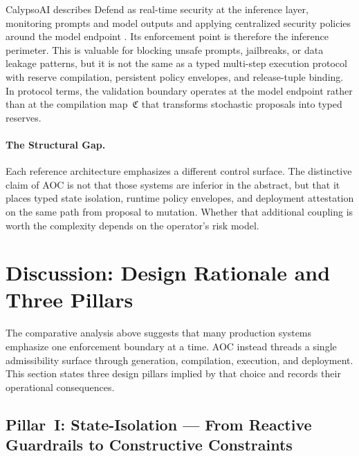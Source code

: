 \documentclass[11pt]{article}
\theoremstyle{remark}
\newcommand{\AOC}{\textup{\textsc{AOC}}}
\begin{document}
\begin{description}[style=nextline, leftmargin=1.5em]
\item[CalypsoAI --- inference-layer perimeter security.]
CalypsoAI describes Defend as real-time security at the inference layer, monitoring prompts and model outputs and applying centralized security policies around the model endpoint \cite{calypsoai_defend}. Its enforcement point is therefore the inference perimeter. This is valuable for blocking unsafe prompts, jailbreaks, or data leakage patterns, but it is not the same as a typed multi-step execution protocol with reserve compilation, persistent policy envelopes, and release-tuple binding. In protocol terms, the validation boundary operates at the model endpoint rather than at the compilation map~$\mathfrak{C}$ that transforms stochastic proposals into typed reserves.
\end{description}

\paragraph{The Structural Gap.}
Each reference architecture emphasizes a different control surface. The distinctive claim of \AOC{} is not that those systems are inferior in the abstract, but that it places typed state isolation, runtime policy envelopes, and deployment attestation on the same path from proposal to mutation. Whether that additional coupling is worth the complexity depends on the operator's risk model.

\section[Discussion]{Discussion: Design Rationale and Three Pillars}\label{sec:discussion}

The comparative analysis above suggests that many production systems emphasize one enforcement boundary at a time. \AOC{} instead threads a single admissibility surface through generation, compilation, execution, and deployment. This section states three design pillars implied by that choice and records their operational consequences.

\subsection[Pillar~I: State-Isolation]{Pillar~I: State-Isolation --- From Reactive Guardrails to Constructive Constraints}
\end{document}
